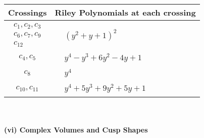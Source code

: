 \documentclass[1p]{elsarticle_modified}
\theoremstyle{definition}
\begin{document}
\begin{tabular}{m{50pt}|m{274pt}}
Crossings & \hspace{64pt}Riley Polynomials at each crossing \\
\hline $$\begin{aligned}c_{1},c_{2},c_{3}\\c_{6},c_{7},c_{9}\\c_{12}\end{aligned}$$&$\begin{aligned}
&(y^2+y+1)^2
\end{aligned}$\\
\hline $$\begin{aligned}c_{4},c_{5}\end{aligned}$$&$\begin{aligned}
&y^4- y^3+6 y^2-4 y+1
\end{aligned}$\\
\hline $$\begin{aligned}c_{8}\end{aligned}$$&$\begin{aligned}
&y^4
\end{aligned}$\\
\hline $$\begin{aligned}c_{10},c_{11}\end{aligned}$$&$\begin{aligned}
&y^4+5 y^3+9 y^2+5 y+1
\end{aligned}$\\
\hline
\end{tabular}\\~\\
\newpage\flushleft \textbf{(vi) Complex Volumes and Cusp Shapes}
\end{document}
